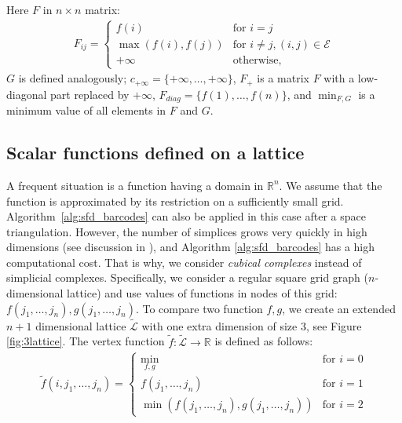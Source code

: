 \documentclass[runningheads]{llncs}
\begin{document}
Here $F$ in $n\times n$ matrix:
\begin{gather*}
F_{ij} =   
\begin{cases}
  f(i) & \text{for } i = j\\    
  \max(f(i), f(j)) & \text{for } i \neq j, (i, j) \in \mathcal{E} \\
  +\infty & \text{otherwise,}
\end{cases}
\end{gather*}
$G$ is defined analogously; $c_{+\infty} = \{+\infty, \ldots, +\infty\}$, $F_{+}$ is a matrix $F$ with a low-diagonal part replaced by $+\infty$, $F_{diag} = \{f(1), \ldots, f(n)\}$, and $\min_{F,G}$ is a minimum value of all elements in $F$ and $G$.

\fi

\subsection{Scalar functions defined on a lattice}
\label{sec:cubical_complex}



A frequent situation is a function having a domain in $\mathbb{R}^n$.
We assume that the function is approximated by its restriction on a sufficiently small grid. 
Algorithm~\ref{alg:sfd_barcodes} can also be applied in this case after a space triangulation. However, the number of simplices grows very quickly in high dimensions (see discussion in \cite{wagner2011efficient}), and Algorithm \ref{alg:sfd_barcodes} has a high computational cost. That is why, we consider \textit{cubical complexes} \cite{kaczynski2004computational} instead of simplicial complexes. Specifically, we consider a regular square grid graph ($n$-dimensional lattice) and use values of functions in nodes of this grid: $f(j_1, \ldots, j_n), g(j_1, \ldots, j_n)$.
To compare two function $f,g$, we create an extended $n+1$ dimensional lattice $\tilde{\mathcal{L}}$ with one extra dimension of size $3$, see Figure \ref{fig:3lattice}. The vertex function $\tilde{f}: \tilde{\mathcal{L}} \to \mathbb{R}$ is defined as follows:
\begin{gather*}
\tilde{f}(i,j_1, \ldots, j_n) =   
\begin{cases}
  \min_{f, g} & \!\! \text{for } i = 0\\    
  f(j_1, \ldots, j_n) & \!\! \text{for } i = 1 \\
  \min(f(j_1, \ldots, j_n), g(j_1, \ldots, j_n)) & \!\! \text{for } i = 2
\end{cases}
\end{gather*}
\end{document}
